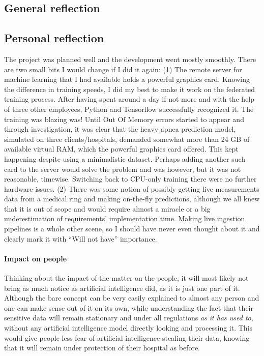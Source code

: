 \subsection{General reflection}


\subsection{Personal reflection}


The project was planned well and the development went mostly smoothly. There are two small bits I would change if I did it again: (1) The remote server for machine learning that I had available holds a powerful graphics card. Knowing the difference in training speeds, I did my best to make it work on the federated training process. After having spent around a day if not more and with the help of three other employees, Python and Tensorflow successfully recognized it. The training was blazing was! Until Out Of Memory errors started to appear and through investigation, it was clear that the heavy apnea prediction model, simulated on three clients/hospitals, demanded somewhat more than 24 GB of available virtual RAM, which the powerful graphics card offered. This kept happening despite using a minimalistic dataset. Perhaps adding another such card to the server would solve the problem and was however, but it was not reasonable, timewise. Switching back to CPU-only training there were no further hardware issues. (2) There was some notion of possibly getting live measurements data from a medical ring and making on-the-fly predictions, although we all knew that it is out of scope and would require almost a miracle or a big underestimation of requirements' implementation time. Making live ingestion pipelines is a whole other scene, so I should have never even thought about it and clearly mark it with ``Will not have'' importance.


\paragraph{Impact on people} Thinking about the impact of the matter on the people, it will most likely not bring as much notice as artificial intelligence did, as it is just one part of it. Although the bare concept can be very easily explained to almost any person and one can make sense out of it on its own, while understanding the fact that their sensitive data will remain stationary and under all regulations \emph{as it has used to}, without any artificial intelligence model directly looking and processing it. This would give people less fear of artificial intelligence stealing their data, knowing that it will remain under protection of their hospital as before.

